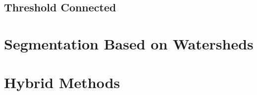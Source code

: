 \subsection{Threshold Connected}

\section{Segmentation Based on Watersheds}
\label{sec:WatershedSegmentation}






\section{Hybrid Methods} 
\label{sec:HybridSegmentationMethods}

